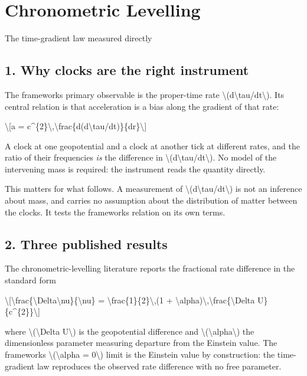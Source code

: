 \documentclass[
  10pt,
]{article}
\author{}
\date{}
\begin{document}
\hypertarget{chronometric-levelling}{%
\section{Chronometric Levelling}\label{chronometric-levelling}}

The time-gradient law measured directly

\hypertarget{why-clocks-are-the-right-instrument}{%
\subsection{1. Why clocks are the right
instrument}\label{why-clocks-are-the-right-instrument}}

The framework\textquotesingle s primary observable is the proper-time
rate \textbackslash(d\textbackslash tau/dt\textbackslash). Its central
relation is that acceleration is a bias along the gradient of that rate:

\textbackslash{[}a =
c\^{}\{2\}\textbackslash,\textbackslash frac\{d(d\textbackslash tau/dt)\}\{dr\}\textbackslash{]}

A clock at one geopotential and a clock at another tick at different
rates, and the ratio of their frequencies \emph{is} the difference in
\textbackslash(d\textbackslash tau/dt\textbackslash). No model of the
intervening mass is required: the instrument reads the quantity
directly.

This matters for what follows. A measurement of
\textbackslash(d\textbackslash tau/dt\textbackslash) is not an inference
about mass, and carries no assumption about the distribution of matter
between the clocks. It tests the framework\textquotesingle s relation on
its own terms.

\hypertarget{three-published-results}{%
\subsection{2. Three published results}\label{three-published-results}}

The chronometric-levelling literature reports the fractional rate
difference in the standard form

\textbackslash{[}\textbackslash frac\{\textbackslash Delta\textbackslash nu\}\{\textbackslash nu\}
= \textbackslash frac\{1\}\{2\}\textbackslash,(1 +
\textbackslash alpha)\textbackslash,\textbackslash frac\{\textbackslash Delta
U\}\{c\^{}\{2\}\}\textbackslash{]}

where \textbackslash(\textbackslash Delta U\textbackslash) is the
geopotential difference and
\textbackslash(\textbackslash alpha\textbackslash) the dimensionless
parameter measuring departure from the Einstein value. The
framework\textquotesingle s \textbackslash(\textbackslash alpha =
0\textbackslash) limit is the Einstein value by construction: the
time-gradient law reproduces the observed rate difference with no free
parameter.
\end{document}
